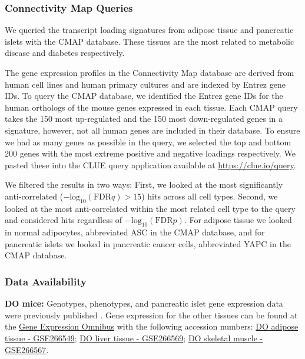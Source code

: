 \documentclass[
]{article}
\begin{document}
\subsubsection{Connectivity Map Queries}\label{connectivity-map-queries}

We queried the transcript loading signatures from adipose tissue and
pancreatic islets with the CMAP database. These tissues are the most
related to metabolic disease and diabetes respectively.

The gene expression profiles in the Connectivity Map database are
derived from human cell lines and human primary cultures and are indexed
by Entrez gene IDs. To query the CMAP database, we identified the Entrez
gene IDs for the human orthologs of the mouse genes expressed in each
tissue. Each CMAP query takes the 150 most up-regulated and the 150 most
down-regulated genes in a signature, however, not all human genes are
included in their database. To ensure we had as many genes as possible
in the query, we selected the top and bottom 200 genes with the most
extreme positive and negative loadings respectively. We pasted these
into the CLUE query application available at
\url{https://clue.io/query}.

We filtered the results in two ways: First, we looked at the most
significantly anti-correlated
(\(-\mathrm{log}_{10}(\mathrm{FDR} q) > 15\)) hits across all cell
types. Second, we looked at the most anti-correlated within the most
related cell type to the query and considered hits regardless of
\(-\mathrm{log}_{10}(\mathrm{FDR} p)\). For adipose tissue we looked in
normal adipocytes, abbreviated ASC in the CMAP database, and for
pancreatic islets we looked in pancreatic cancer cells, abbreviated YAPC
in the CMAP database.

\subsubsection{Data Availability}\label{data-availability}

\textbf{DO mice:} Genotypes, phenotypes, and pancreatic islet gene
expression data were previously published \cite{pmid29567659}. Gene
expression for the other tissues can be found at the
\href{https://www.ncbi.nlm.nih.gov/geo/}{Gene Expression Omnibus} with
the following accession numbers:
\href{https://www.ncbi.nlm.nih.gov/geo/query/acc.cgi?acc=GSE266549}{DO
adipose tissue - GSE266549};
\href{https://www.ncbi.nlm.nih.gov/geo/query/acc.cgi?acc=GSE266569}{DO
liver tissue - GSE266569};
\href{https://www.ncbi.nlm.nih.gov/geo/query/acc.cgi?acc=GSE266567}{DO
skeletal muscle - GSE266567}.
\end{document}
